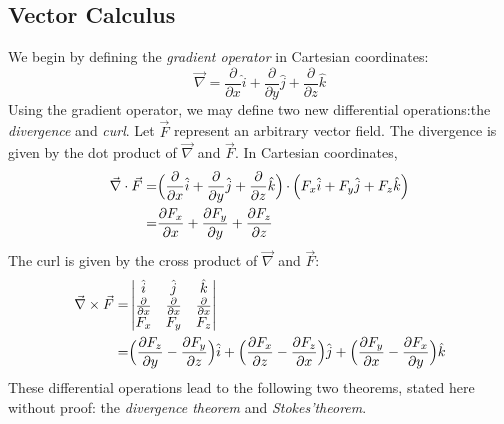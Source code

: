 \documentclass[12pt]{article}
\numberwithin{equation}{section}
\begin{document}
\subsection{Vector Calculus}
We begin by defining the \emph{gradient operator} in Cartesian coordinates:
\begin{equation}
    \vec{\nabla}=\frac{\partial}{\partial{x}}\hat{i}+\frac{\partial}{\partial{y}}\hat{j}+\frac{\partial}{\partial{z}}\hat{k}
\end{equation}
Using the gradient operator, we may define two new differential operations:the \emph{divergence}
and \emph{curl}. Let $\vec{F}$ represent an arbitrary vector field. The divergence is given by the dot product of $\vec{\nabla}$ and $\vec{F}$.
In Cartesian coordinates,
\begin{equation}
    \begin{split}
        \vec{\nabla}\cdot\vec{F}=&\Bigl(\frac{\partial}{\partial{x}}\hat{i}+\frac{\partial}{\partial{y}}\hat{j}+\frac{\partial}{\partial{z}}\hat{k}\Bigl)\,\cdot\,\Bigl(F_x\hat{i}+F_y\hat{j}+F_z\hat{k}\Bigl)\\
        =&\frac{\partial{F_x}}{\partial{x}}+\frac{\partial{F_y}}{\partial{y}}+\frac{\partial{F_z}}{\partial{z}}
    \end{split}\label{A12}
\end{equation}
The curl is given by the cross product of $\vec{\nabla}$ and $\vec{F}$:
\begin{equation}
    \begin{split}
        \vec{\nabla}\times\vec{F}=
        &\begin{vmatrix}
            \hat{i} &\hat{j} &\hat{k}\\
            \frac{\partial}{\partial{x}} &\frac{\partial}{\partial{x}} &\frac{\partial}{\partial{x}}\\
            F_x &F_y &F_z
        \end{vmatrix}\\
        =&\Bigl(\frac{\partial{F_z}}{\partial{y}}-\frac{\partial{F_y}}{\partial{z}}\Bigl)\hat{i}+\Bigl(\frac{\partial{F_x}}{\partial{z}}-\frac{\partial{F_z}}{\partial{x}}\Bigl)\hat{j}+\Bigl(\frac{\partial{F_y}}{\partial{x}}-\frac{\partial{F_x}}{\partial{y}}\Bigl)\hat{k}
    \end{split}
\end{equation}
\indent These differential operations lead to the following two theorems, stated here without proof: the \emph{divergence theorem} and \emph{Stokes'theorem}.\\
\\
\end{document}
